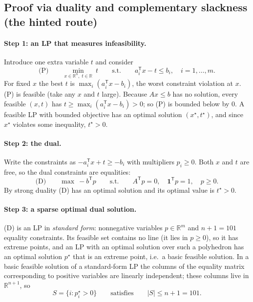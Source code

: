 \documentclass[11pt]{article}
\newcommand{\R}{\mathbb{R}}
\newcommand{\T}{^{\mathsf T}}
\newcommand{\ones}{\mathbf{1}}
\begin{document}
\subsection*{Proof via duality and complementary slackness (the hinted route)}

\paragraph{Step 1: an LP that measures infeasibility.} Introduce one extra variable $t$ and consider
\[
\text{(P)}\qquad \min_{x\in\R^n,\;t\in\R}\ t\qquad\text{s.t.}\qquad a_i\T x-t\le b_i,\quad i=1,\dots,m .
\]
For fixed $x$ the best $t$ is $\max_i(a_i\T x-b_i)$, the worst constraint violation at $x$. (P) is feasible (take any $x$ and $t$ large). Because $Ax\le b$ has no solution, every feasible $(x,t)$ has $t\ge\max_i(a_i\T x-b_i)>0$; so (P) is bounded below by $0$. A feasible LP with bounded objective has an optimal solution $(x^\star,t^\star)$, and since $x^\star$ violates some inequality, $t^\star>0$.

\paragraph{Step 2: the dual.} Write the constraints as $-a_i\T x+t\ge-b_i$ with multipliers $p_i\ge0$. Both $x$ and $t$ are free, so the dual constraints are equalities:
\[
\text{(D)}\qquad \max\ -b\T p\qquad\text{s.t.}\qquad A\T p=0,\quad \ones\T p=1,\quad p\ge0 .
\]
By strong duality (D) has an optimal solution and its optimal value is $t^\star>0$.

\paragraph{Step 3: a sparse optimal dual solution.} (D) is an LP in \emph{standard form}: nonnegative variables $p\in\R^{m}$ and $n+1=101$ equality constraints. Its feasible set contains no line (it lies in $p\ge0$), so it has extreme points, and an LP with an optimal solution over such a polyhedron has an optimal solution $p^\star$ that is an extreme point, i.e.\ a basic feasible solution. In a basic feasible solution of a standard-form LP the columns of the equality matrix corresponding to positive variables are linearly independent; these columns live in $\R^{n+1}$, so
\[
S=\{i:p_i^\star>0\}\qquad\text{satisfies}\qquad |S|\le n+1=101 .
\]
\end{document}
